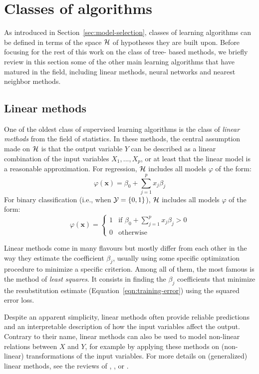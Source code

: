\section{Classes of algorithms}

As introduced in Section~\ref{sec:model-selection}, classes of  learning
algorithms can be defined in terms of the space ${\cal H}$ of hypotheses  they
are built upon. Before focusing for the rest of this work on the class of tree-
based methods, we briefly review in this section some of the other main
learning algorithms that have matured in the field, including linear methods,
neural networks and nearest neighbor methods.

\subsection{Linear methods}

One of the oldest class of supervised learning algorithms is the class of
\textit{linear methods} from the field of statistics. In these methods, the central
assumption made on ${\cal H}$ is that the output variable $Y$ can be described
as a linear combination of the input variables $X_1, ..., X_p$, or at least
that the linear model is a reasonable approximation. For regression, ${\cal H}$
includes all models $\varphi$ of the form:
\begin{equation}
\varphi(\mathbf{x}) = \beta_0 + \sum_{j=1}^p x_j \beta_j
\end{equation}
For binary classification (i.e., when ${\cal Y}=\{0, 1\}$),  ${\cal H}$ includes all
models $\varphi$ of the form:
\begin{equation}
\varphi(\mathbf{x}) = \begin{cases}
1 & \text{if } \beta_0 + \sum_{j=1}^p x_j \beta_j > 0\\
0 & \text{otherwise}
\end{cases}
\end{equation}

Linear methods come in many flavours but mostly differ from each other in the
way they estimate the coefficient $\beta_j$, usually using some specific
optimization procedure to minimize a specific criterion. Among all of them, the
most famous is the method of \textit{least squares}. It consists in finding the
$\beta_j$ coefficients that minimize the resubstitution estimate
(Equation~\ref{eqn:training-error}) using the squared error loss.

Despite an apparent simplicity, linear methods often provide reliable
predictions and an interpretable description of how the input variables affect
the output. Contrary to their name, linear methods can also be used to model
non-linear relations between $X$ and $Y$, for example by applying these methods
on (non-linear) transformations of the input variables. For more details on
(generalized) linear methods, see the reviews of \citet{maccullagh:1989},
\citet{hastie:2005}, \citet{bishop:2006} or \citet{duda:2012}.

